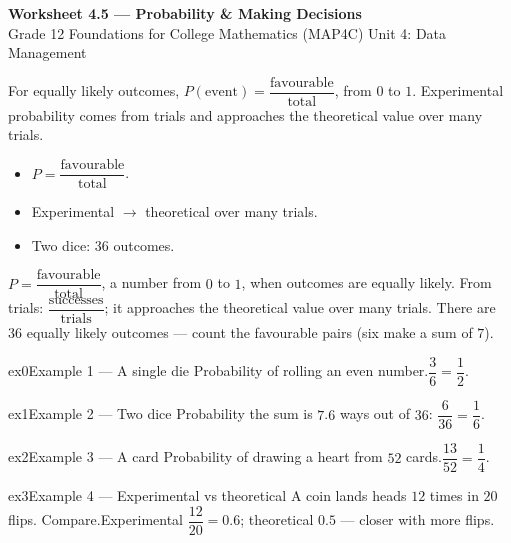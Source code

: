 \documentclass[11pt]{article}
\begin{document}
\begin{center}
{\LARGE\bfseries\color{titleblue}Worksheet 4.5 --- Probability \& Making Decisions}\\[2pt]
{\small Grade 12 Foundations for College Mathematics (MAP4C) \textperiodcentered{} Unit 4: Data Management}
\end{center}

\begin{ideabox}
For equally likely outcomes, $P(\text{event})=\dfrac{\text{favourable}}{\text{total}}$, from $0$ to $1$. Experimental probability comes from trials and approaches the theoretical value over many trials.
\begin{itemize}[leftmargin=*,itemsep=2pt]
  \item $P=\dfrac{\text{favourable}}{\text{total}}$.
  \item Experimental $\to$ theoretical over many trials.
  \item Two dice: $36$ outcomes.
\end{itemize}
\end{ideabox}

\begin{learnbox}
$P=\dfrac{\text{favourable}}{\text{total}}$, a number from $0$ to $1$, when outcomes are equally likely.
From trials: $\dfrac{\text{successes}}{\text{trials}}$; it approaches the theoretical value over many trials.
There are $36$ equally likely outcomes — count the favourable pairs (six make a sum of $7$).
\end{learnbox}


\begin{example}{ex0}{Example 1 --- A single die}
Probability of rolling an even number.\soln $\dfrac{3}{6}=\dfrac12$.
\end{example}

\begin{example}{ex1}{Example 2 --- Two dice}
Probability the sum is $7$.\soln $6$ ways out of $36$: $\dfrac{6}{36}=\dfrac16$.
\end{example}

\begin{example}{ex2}{Example 3 --- A card}
Probability of drawing a heart from $52$ cards.\soln $\dfrac{13}{52}=\dfrac14$.
\end{example}

\begin{example}{ex3}{Example 4 --- Experimental vs theoretical}
A coin lands heads $12$ times in $20$ flips. Compare.\soln Experimental $\dfrac{12}{20}=0.6$; theoretical $0.5$ — closer with more flips.
\end{example}
\end{document}

